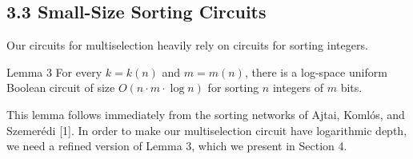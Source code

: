 \subsection*{3.3 Small-Size Sorting Circuits}
Our circuits for multiselection heavily rely on circuits for sorting integers.
\begin{originalresult}{Lemma 3}
For every $k=k(n)$ and $m=m(n)$, there is a log-space uniform Boolean circuit of size $O(n\cdot m\cdot\log n)$ for sorting $n$ integers of $m$ bits.
\end{originalresult}
This lemma follows immediately from the sorting networks of Ajtai, Koml\'os, and Szemer\'edi [1]. In order to make our multiselection circuit have logarithmic depth, we need a refined version of Lemma 3, which we present in Section 4.
